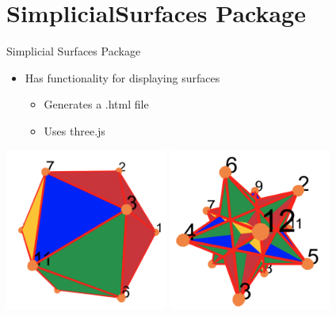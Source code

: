 \documentclass{beamer}
\numberwithin{equation}{aufgabe}
\begin{document}
\section{SimplicialSurfaces Package}
\begin{frame}{Simplicial Surfaces Package}
    \begin{itemize}[label=-]
        \item Has functionality for displaying surfaces
        \begin{itemize}[label=-]
            \item Generates a .html file
            \item Uses three.js
        \end{itemize}
    \end{itemize}
    \pause
    \begin{example}
        \includegraphics[width=0.4\textwidth]{images/ico-old.png}
        \includegraphics[width=0.4\textwidth]{images/ico2-1_old.png}
    \end{example}
\end{frame}

\end{document}
